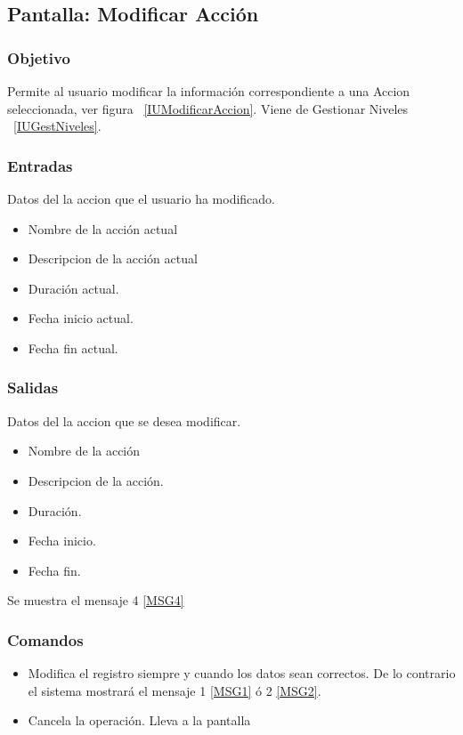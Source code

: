 \subsection{Pantalla: Modificar Acción}

\subsubsection{Objetivo}
Permite al usuario modificar la información correspondiente a una Accion  seleccionada, ver figura ~\ref{IUModificarAccion}. Viene de Gestionar Niveles ~\ref{IUGestNiveles}.


\subsubsection{Entradas}
 Datos del la accion  que el usuario ha modificado. 
\begin{itemize}
 \item Nombre de la acción actual
 \item Descripcion de la acción actual
 \item Duración actual.
 \item Fecha inicio actual.
 \item Fecha fin actual.
\end{itemize}

\subsubsection{Salidas}
 Datos del la accion  que se desea modificar. 
\begin{itemize}
 \item Nombre de la acción
 \item Descripcion de la acción.
 \item Duración.
 \item Fecha inicio.
 \item Fecha fin.
\end{itemize}
Se muestra el mensaje 4 \ref{MSG4}


\subsubsection{Comandos}
\begin{itemize}
 \item {} Modifica el registro siempre y cuando los datos sean correctos. De lo contrario el sistema mostrará el mensaje 1 \ref{MSG1} ó 2 \ref{MSG2}.
 \item {} Cancela la operación. Lleva a la pantalla 

\end{itemize}
